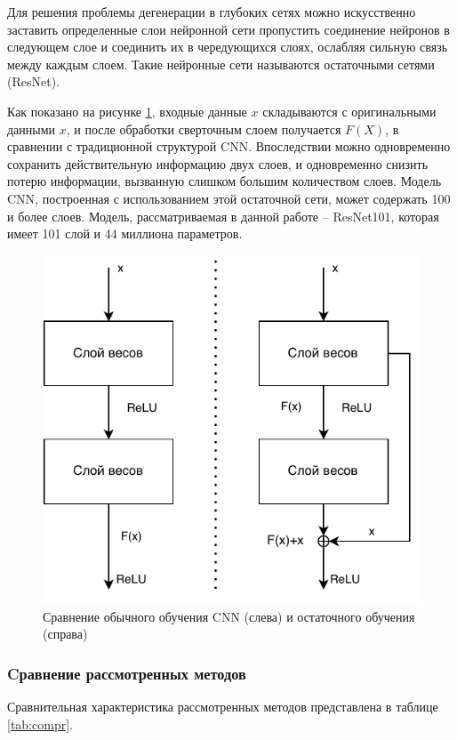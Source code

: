  Для решения проблемы дегенерации в глубоких сетях можно искусственно заставить определенные слои нейронной сети пропустить соединение нейронов в следующем слое и соединить их в чередующихся слоях, ослабляя сильную связь между каждым слоем. Такие нейронные сети называются остаточными сетями (ResNet).
 
 Как показано на рисунке \ref{fig:resnet}, входные данные $x$ складываются с оригинальными данными $x$, и после обработки сверточным слоем получается $F(X)$, в сравнении с традиционной структурой CNN. Впоследствии можно одновременно сохранить действительную информацию двух слоев, и одновременно снизить потерю информации, вызванную слишком большим количеством слоев. Модель CNN, построенная с использованием этой остаточной сети, может содержать 100 и более слоев. Модель, рассматриваемая в данной работе -- ResNet101, которая имеет 101 слой и 44 миллиона параметров.
 
 \begin{figure}[hbtp]
 	\centering
 	\includegraphics[width=\textwidth]{img/resnet.pdf}
 	\caption{Сравнение обычного обучения CNN (слева) и остаточного обучения (справа)}
 	\label{fig:resnet}
 \end{figure}
 \clearpage
 
 \subsubsection{Cравнение рассмотренных методов}
 Сравнительная характеристика рассмотренных методов представлена в
 таблице \ref{tab:compr}. 
 
